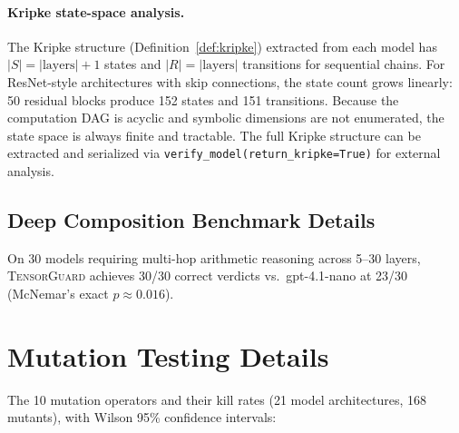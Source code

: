 \documentclass[11pt]{article}
\begin{document}
\paragraph{Kripke state-space analysis.}
The Kripke structure (Definition~\ref{def:kripke}) extracted from each
model has $|S| = |\text{layers}| + 1$ states and $|R| = |\text{layers}|$
transitions for sequential chains.  For ResNet-style architectures with
skip connections, the state count grows linearly: 50 residual blocks
produce 152 states and 151 transitions.  Because the computation DAG is
acyclic and symbolic dimensions are not enumerated, the state space is
always finite and tractable.  The full Kripke structure can be extracted
and serialized via \texttt{verify\_model(return\_kripke=True)} for
external analysis.


\subsection{Deep Composition Benchmark Details}\label{sec:deep-comp}

On 30 models requiring multi-hop arithmetic reasoning across
5--30 layers, \textsc{TensorGuard} achieves 30/30 correct verdicts
vs.\ gpt-4.1-nano at 23/30 (McNemar's exact $p \approx 0.016$).


\section{Mutation Testing Details}\label{app:mutation}

The 10 mutation operators and their kill rates (21 model architectures,
168 mutants), with Wilson 95\% confidence intervals:
\end{document}
